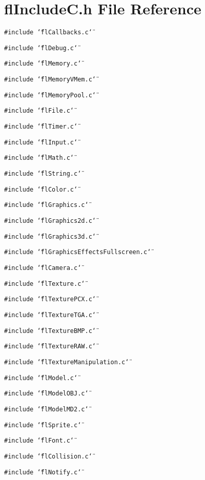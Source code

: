\section{fl\-Include\-C.h File Reference}
\label{flIncludeC_8h}
{\tt \#include \char`\"{}fl\-Callbacks.c\char`\"{}}\par
{\tt \#include \char`\"{}fl\-Debug.c\char`\"{}}\par
{\tt \#include \char`\"{}fl\-Memory.c\char`\"{}}\par
{\tt \#include \char`\"{}fl\-Memory\-VMem.c\char`\"{}}\par
{\tt \#include \char`\"{}fl\-Memory\-Pool.c\char`\"{}}\par
{\tt \#include \char`\"{}fl\-File.c\char`\"{}}\par
{\tt \#include \char`\"{}fl\-Timer.c\char`\"{}}\par
{\tt \#include \char`\"{}fl\-Input.c\char`\"{}}\par
{\tt \#include \char`\"{}fl\-Math.c\char`\"{}}\par
{\tt \#include \char`\"{}fl\-String.c\char`\"{}}\par
{\tt \#include \char`\"{}fl\-Color.c\char`\"{}}\par
{\tt \#include \char`\"{}fl\-Graphics.c\char`\"{}}\par
{\tt \#include \char`\"{}fl\-Graphics2d.c\char`\"{}}\par
{\tt \#include \char`\"{}fl\-Graphics3d.c\char`\"{}}\par
{\tt \#include \char`\"{}fl\-Graphics\-Effects\-Fullscreen.c\char`\"{}}\par
{\tt \#include \char`\"{}fl\-Camera.c\char`\"{}}\par
{\tt \#include \char`\"{}fl\-Texture.c\char`\"{}}\par
{\tt \#include \char`\"{}fl\-Texture\-PCX.c\char`\"{}}\par
{\tt \#include \char`\"{}fl\-Texture\-TGA.c\char`\"{}}\par
{\tt \#include \char`\"{}fl\-Texture\-BMP.c\char`\"{}}\par
{\tt \#include \char`\"{}fl\-Texture\-RAW.c\char`\"{}}\par
{\tt \#include \char`\"{}fl\-Texture\-Manipulation.c\char`\"{}}\par
{\tt \#include \char`\"{}fl\-Model.c\char`\"{}}\par
{\tt \#include \char`\"{}fl\-Model\-OBJ.c\char`\"{}}\par
{\tt \#include \char`\"{}fl\-Model\-MD2.c\char`\"{}}\par
{\tt \#include \char`\"{}fl\-Sprite.c\char`\"{}}\par
{\tt \#include \char`\"{}fl\-Font.c\char`\"{}}\par
{\tt \#include \char`\"{}fl\-Collision.c\char`\"{}}\par
{\tt \#include \char`\"{}fl\-Notify.c\char`\"{}}\par

